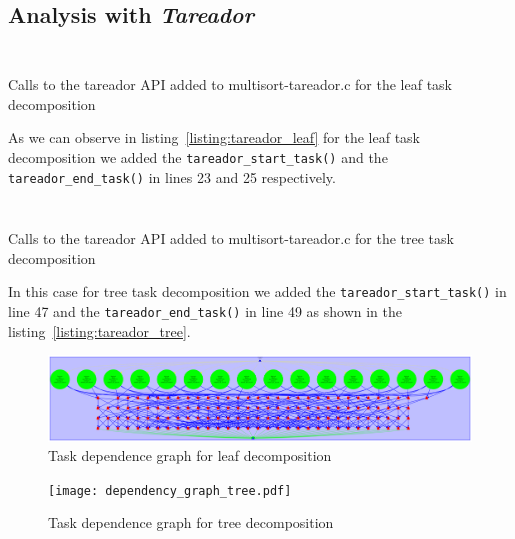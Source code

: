 \subsection{Analysis with \emph{Tareador}}


\begin{listing}[H]
\inputminted[firstline=20,lastline=31]{c}{sources/multisort-tareador-leaf.c}
\inputminted[firstline=33,lastline=51]{c}{sources/multisort-tareador-leaf.c}
\caption{Calls to the tareador API added to multisort-tareador.c for the leaf task decomposition}
\label{listing:tareador_leaf}
\end{listing}

As we can observe in listing~\ref{listing:tareador_leaf} for the leaf task decomposition we added the \texttt{tareador\_start\_task()} and the \texttt{tareador\_end\_task()} in lines 23 and 25 respectively.

\begin{listing}[H]
\inputminted[firstline=20,lastline=31]{c}{sources/multisort-tareador-tree.c}
\inputminted[firstline=33,lastline=51]{c}{sources/multisort-tareador-tree.c}
\caption{Calls to the tareador API added to multisort-tareador.c for the tree task decomposition}
\label{listing:tareador_tree}
\end{listing}

In this case for tree task decomposition we added the \texttt{tareador\_start\_task()} in line 47 and the \texttt{tareador\_end\_task()} in line 49 as shown in the listing~\ref{listing:tareador_tree}.

\begin{figure}[H]
\centering
\includegraphics[width=\textwidth]{dependency_graph_leaf.pdf}
\caption{Task dependence graph for leaf decomposition}
\label{fig:tar_tasks_leaf}
\end{figure}

\begin{figure}[H]
\centering
\texttt{[image: dependency\_graph\_tree.pdf]}
\caption{Task dependence graph for tree decomposition}
\label{fig:tar_tasks_tree}
\end{figure}

